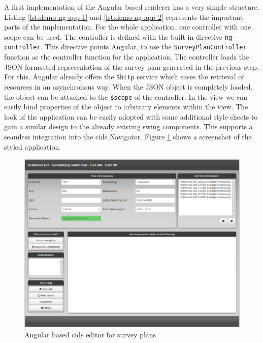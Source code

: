 A first implementation of the Angular based renderer has a very simple structure.
Listing \ref{lst:demo-ng-app-1} and \ref{lst:demo-ng-app-2} represents the important parts of the implementation.
For the whole application, one controller with one scope can be used.
The controller is defined with the built in directive \texttt{ng-controller}.
This directive points Angular, to use the \texttt{SurveyPlanController} function as the controller function for the application.
The controller loads the JSON formatted representation of the survey plan generated in the previous step.
For this, Angular already offers the \texttt{\$http} service which eases the retrieval of resources in an asynchronous way.
When the JSON object is completely loaded, the object can be attached to the \texttt{\$scope} of the controller.
In the view we can easily bind properties of the object to arbitrary elements within the view.
The look of the application can be easily adopted with some additional style sheets to gain a similar design to the already existing swing components. This supports a seamless integration into the cids Navigator.
Figure \ref{fig:survey_plan_angular_editor} shows a screenshot of the styled application.

\begin{figure}
	\centering	\includegraphics[width=1.0\textwidth]{./img/impl/survey_plan_editor_new_alpha.png}
	\caption{Angular based cids editor for survey plans}
	\label{fig:survey_plan_angular_editor}
\end{figure}
 
